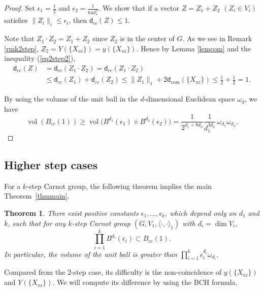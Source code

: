 \documentclass[10pt,a4paper]{amsart}
\numberwithin{equation}{section}
\newtheorem{Theorem}{Theorem}[section]
\begin{document}
\begin{proof}
Set $\epsilon_1=\frac{1}{2}$ and $\epsilon_2=\frac{1}{64d_1^3}$.
We show that if a vector $Z=Z_1+Z_2$ $(Z_i\in V_i)$ satisfies $\|Z_i\|_i\leq \epsilon_i$,
then $\mathsf{d}_{cc}(Z)\leq 1$.

Note that $Z_1\cdot Z_2=Z_1+Z_2$ since $Z_2$ is in the center of $G$.
As we see in Remark \ref{rmk2step},
$Z_2=Y(\{X_{ni}\})=y\left(\{X_{ni}\}\right)$.
Hence by Lemma \ref{lemcom} and the inequality (\ref{eq2step2}),
\begin{align*}
 \mathsf{d}_{cc}(Z)&=\mathsf{d}_{cc}(Z_1\cdot Z_2)
=\mathsf{d}_{cc}(Z_1\cdot Z_2)
\\
 &\leq \mathsf{d}_{cc}(Z_1)+\mathsf{d}_{cc}(Z_2)
\leq \|Z_1\|_1+2\mathsf{d}_{\mathrm{com}}(\{X_{ni}\})
 \leq \frac{1}{2}+\frac{1}{2}=1.
\end{align*}

By using the volume of the unit ball in the $d$-dimensional Euclidean space $\omega_d$,
we have
\[
\operatorname{vol}(B_{cc}(1))\geq \operatorname{vol}\big(B^{d_1}(\epsilon_1)\times B^{d_2}(\epsilon_2)\big)=\frac{1}{2^{d_1+8d_2}}\frac{1}{d_1^{3d_2}}\,\omega_{d_1}\omega_{d_2}.\tag*{\qed}
\]
\renewcommand{\qed}{}
\end{proof}

\subsection{Higher step cases}
For a $k$-step Carnot group,
the following theorem implies the
 main Theorem~\ref{thmmain}.
\begin{Theorem}\label{propmain}
 There exist positive constants $\epsilon_1,\dots,\epsilon_k$,
 which depend only on $d_1$ and $k$,
 such that for any $k$-step Carnot group $(G,V_1,\langle\cdot,\cdot\rangle_1)$ with $d_i=\dim V_i$,
 \[\prod_{i=1}^kB^{d_i}(\epsilon_i)\subset B_{cc}(1).\]
 In particular,
 the volume of the unit ball is greater than $\prod_{i=1}^k\epsilon_i^{d_i}\omega_{d_i}$.
\end{Theorem}

Compared from the $2$-step case,
its difficulty is the non-coincidence of $y(\{X_{ni}\})$ and $Y(\{X_{ni}\})$.
We will compute its difference by using the BCH formula.
\end{document}
